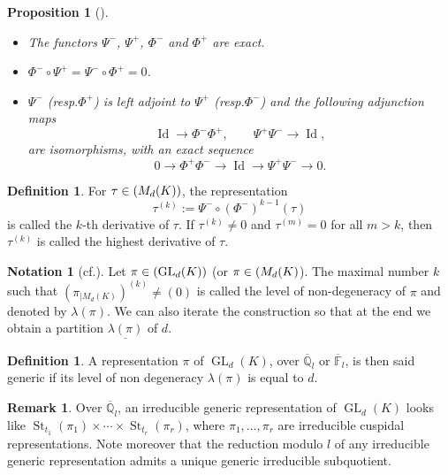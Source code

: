 \documentclass[11pt]{article}
\newcommand{\cf}{cf.\xspace}
\newcommand{\resp}{resp.\xspace}
\newcommand{\skpt}{\smallskip}
\newcommand{\NoChangel}[1]{%
\expandafter\let\csname old\string#1\endcsname=#1
\let#1=\relax
\newcommand{#1}{\mathcode`l="716C\csname old\string#1\endcsname\mathcode`l="7160 }%
}
\DeclareMathOperator{\GL}{GL}
\theoremstyle{plain}
\newtheorem{prop}[equation]{Proposition}
\theoremstyle{definition}
\newtheorem{defin}[equation]{Definition}
\newtheorem*{remark}{Remark}
\newtheorem{nota}[equation]{Notation}
\numberwithin{equation}{subsection}
\newcommand\Fm{{\mathbb F}}
\newcommand\Qm{{\mathbb Q}}
\DeclareMathOperator{\Id}{Id}
\DeclareMathOperator{\st}{St}
\DeclareMathOperator{\alg}{Alg}\NoChangel{\alg}
\begin{document}
\skpt
\begin{prop}[{\cite[p.\,451]{zelevinski1}}]
\begin{itemize}
\item The functors $\Psi^-$, $\Psi^+$, $\Phi^-$ and $\Phi^+$ are exact.

\item $\Phi^- \circ \Psi^+=\Psi^- \circ \Phi^+=0$.

\item $\Psi^-$ (\resp $\Phi^+$) is left adjoint to $\Psi^+$ (\resp $\Phi^-$) and the
following adjunction maps
\[
\Id \to \Phi^- \Phi^+, \qquad \Psi^+ \Psi^- \to \Id,
\]
are isomorphisms, with an exact sequence
\[
0 \to \Phi^+ \Phi^- \to \Id \to \Psi^+ \Psi^-
\to 0.
\]
\end{itemize}
\end{prop}

\begin{defin}
For $\tau \in \alg(M_d(K))$, the representation
\[
\tau^{(k)}:=\Psi^- \circ (\Phi^-)^{k-1}(\tau)
\]
is called the $k$-th derivative of $\tau$. If $\tau^{(k)}\neq 0$ and $\tau^{(m)}=0$
for all $m > k$, then $\tau^{(k)}$ is called the highest derivative of $\tau$.
\end{defin}

\begin{nota}[{\cf \cite[4.3]{zelevinski2}}] \label{nota-nondegeneracy}
Let $\pi \in \alg(\GL_d(K))$ (or $\pi \in \alg(M_d(K)$). The maximal number $k$ such that
$(\pi_{|M_d(K)})^{(k)} \neq (0)$ is called the level of non-degeneracy of $\pi$ and
denoted by $\lambda(\pi)$. We can also iterate the construction so that at the end we obtain
a partition $\underline{\lambda(\pi)}$ of $d$.
\end{nota}

\begin{defin}
A representation $\pi$ of $\GL_d(K)$, over $\overline \Qm_l$ or $\overline \Fm_l$, is then said generic
if its level of non degeneracy $\lambda(\pi)$ is equal to $d$.
\end{defin}

\begin{remark}
Over $\overline \Qm_l$, an irreducible generic representation of
$\GL_d(K)$ looks like $\st_{t_1}(\pi_1) \times \cdots \times \st_{t_r}(\pi_r)$,
where $\pi_1,\dots, \pi_r$ are irreducible cuspidal representations. Note
moreover that the reduction modulo $l$ of any irreducible generic representation
admits a unique generic irreducible subquotient.
\end{remark}
\end{document}
